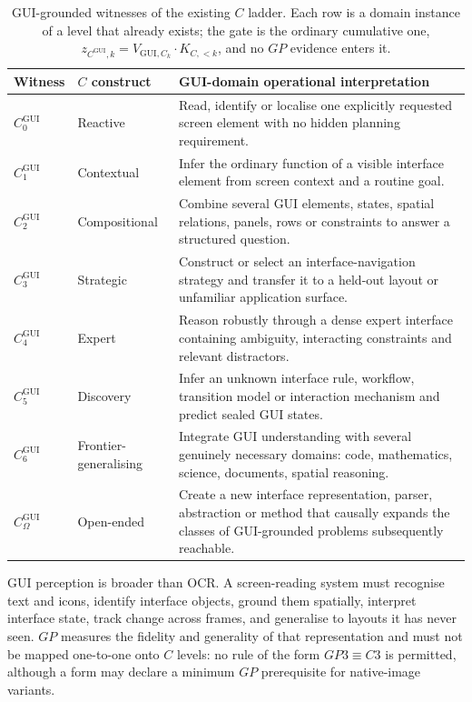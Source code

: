 \begin{table}[!htbp]
\centering\small
\begin{tabularx}{\textwidth}{@{}llY@{}}
\toprule
Witness & $C$ construct & GUI-domain operational interpretation \\
\midrule
$C^{\mathrm{GUI}}_0$ & Reactive & Read, identify or localise one explicitly requested screen element with no hidden planning requirement. \\
$C^{\mathrm{GUI}}_1$ & Contextual & Infer the ordinary function of a visible interface element from screen context and a routine goal. \\
$C^{\mathrm{GUI}}_2$ & Compositional & Combine several GUI elements, states, spatial relations, panels, rows or constraints to answer a structured question. \\
$C^{\mathrm{GUI}}_3$ & Strategic & Construct or select an interface-navigation strategy and transfer it to a held-out layout or unfamiliar application surface. \\
$C^{\mathrm{GUI}}_4$ & Expert & Reason robustly through a dense expert interface containing ambiguity, interacting constraints and relevant distractors. \\
$C^{\mathrm{GUI}}_5$ & Discovery & Infer an unknown interface rule, workflow, transition model or interaction mechanism and predict sealed GUI states. \\
$C^{\mathrm{GUI}}_6$ & Frontier-generalising & Integrate GUI understanding with several genuinely necessary domains: code, mathematics, science, documents, spatial reasoning. \\
$C^{\mathrm{GUI}}_{\Omega}$ & Open-ended & Create a new interface representation, parser, abstraction or method that causally expands the classes of GUI-grounded problems subsequently reachable. \\
\bottomrule
\end{tabularx}
\caption{GUI-grounded witnesses of the existing $C$ ladder. Each row is a domain instance of a level that already exists; the gate is the ordinary cumulative one, $z_{C^{\mathrm{GUI}},k} = V_{\mathrm{GUI},C_k}\cdot K_{C,<k}$, and no $GP$ evidence enters it.}
\label{tab:cgui}
\end{table}

GUI perception is broader than OCR. A screen-reading system must recognise text and icons, identify interface objects, ground them spatially, interpret interface state, track change across frames, and generalise to layouts it has never seen. $GP$ measures the fidelity and generality of that representation and must not be mapped one-to-one onto $C$ levels: no rule of the form $GP3 \equiv C3$ is permitted, although a form may declare a minimum $GP$ prerequisite for native-image variants.

